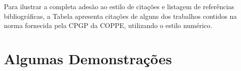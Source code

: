 \documentclass[tcc,numbers]{coppe}
\begin{document}
    
    Para ilustrar a completa ades\~ao ao estilo de cita{\c c}\~oes e listagem de
    refer\^encias bibliogr\'aficas, a Tabela apresenta cita{\c
    c}\~oes de alguns dos trabalhos contidos na norma fornecida pela CPGP da
    COPPE, utilizando o estilo num\'erico.

    \backmatter
    
    
    
    \appendix
    \chapter{Algumas Demonstra{\c c}\~oes}
\end{document}
